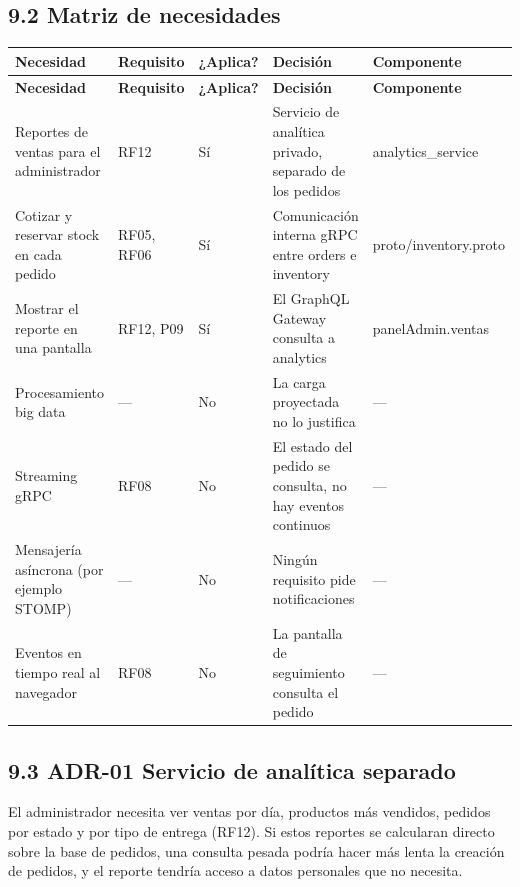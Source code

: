 \documentclass[10pt,letterpaper]{article}
\begin{document}
\subsection*{9.2 Matriz de necesidades}
{\footnotesize
\begin{longtable}{|P{\tabcolsep\relax}|P{\tabcolsep\relax}|P{\tabcolsep\relax}|P{\tabcolsep\relax}|P{\tabcolsep\relax}|}
\hline
\textbf{Necesidad} & \textbf{Requisito} & \textbf{¿Aplica?\allowbreak{}} & \textbf{Decisión} & \textbf{Componente} \\ \hline
\endfirsthead
\hline
\textbf{Necesidad} & \textbf{Requisito} & \textbf{¿Aplica?\allowbreak{}} & \textbf{Decisión} & \textbf{Componente} \\ \hline
\endhead
Reportes de ventas para el administrador & RF12 & Sí & Servicio de analítica privado, separado de los pedidos & analytics\_\allowbreak{}service \\ \hline
Cotizar y reservar stock en cada pedido & RF05, RF06 & Sí & Comunicación interna gRPC entre orders e inventory & proto/\allowbreak{}inventory.\allowbreak{}proto \\ \hline
Mostrar el reporte en una pantalla & RF12, P09 & Sí & El GraphQL Gateway consulta a analytics & panelAdmin.\allowbreak{}ventas \\ \hline
Procesamiento big data & — & No & La carga proyectada no lo justifica & — \\ \hline
Streaming gRPC & RF08 & No & El estado del pedido se consulta, no hay eventos continuos & — \\ \hline
Mensajería asíncrona (por ejemplo STOMP) & — & No & Ningún requisito pide notificaciones & — \\ \hline
Eventos en tiempo real al navegador & RF08 & No & La pantalla de seguimiento consulta el pedido & — \\ \hline
\end{longtable}}

\subsection*{9.3 ADR-01 Servicio de analítica separado}
 El administrador necesita ver ventas por día, productos más vendidos, pedidos por estado y por tipo de entrega (RF12). Si estos reportes se calcularan directo sobre la base de pedidos, una consulta pesada podría hacer más lenta la creación de pedidos, y el reporte tendría acceso a datos personales que no necesita.
\end{document}
